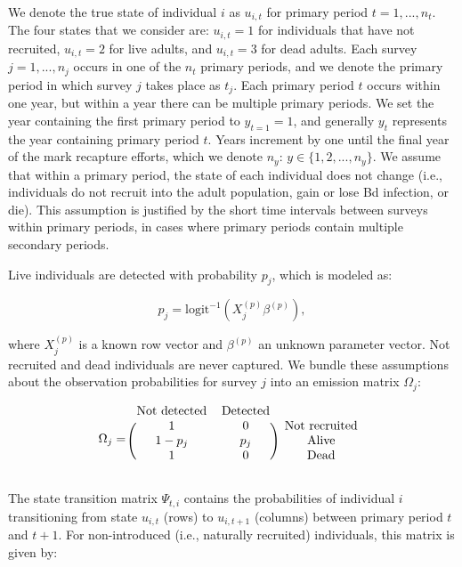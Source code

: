 \documentclass[
  letterpaper,
  DIV=11,
  numbers=noendperiod]{scrartcl}
\begin{document}
We denote the true state of individual \(i\) as \(u_{i, t}\) for primary
period \(t = 1,..., n_t\). The four states that we consider are:
\(u_{i, t} = 1\) for individuals that have not recruited,
\(u_{i, t} =2\) for live adults, and \(u_{i, t} = 3\) for dead adults.
Each survey \(j=1, ..., n_j\) occurs in one of the \(n_t\) primary
periods, and we denote the primary period in which survey \(j\) takes
place as \(t_j\). Each primary period \(t\) occurs within one year, but
within a year there can be multiple primary periods. We set the year
containing the first primary period to \(y_{t = 1} = 1\), and generally
\(y_t\) represents the year containing primary period \(t\). Years
increment by one until the final year of the mark recapture efforts,
which we denote \(n_y\): \(y \in \{1, 2, ..., n_y\}\). We assume that
within a primary period, the state of each individual does not change
(i.e., individuals do not recruit into the adult population, gain or
lose Bd infection, or die). This assumption is justified by the short
time intervals between surveys within primary periods, in cases where
primary periods contain multiple secondary periods.

Live individuals are detected with probability \(p_j\), which is modeled
as:

\[p_j = \text{logit}^{-1}(X_j^{(p)} \beta^{(p)}),\]

where \(X_j^{(p)}\) is a known row vector and \(\beta^{(p)}\) an unknown
parameter vector. Not recruited and dead individuals are never captured.
We bundle these assumptions about the observation probabilities for
survey \(j\) into an emission matrix \(\Omega_j\):

\[
\Omega_j =
\begin{blockarray}{ccc}
  \text{Not detected} & \text{Detected} \\
\begin{block}{(cc)c}
  1 & 0 & \text{Not recruited} \\
  1 - p_j & p_j & \text{Alive} \\
  1 & 0 & \text{Dead} \\
\end{block}
\end{blockarray}
\]

The state transition matrix \(\Psi_{t, i}\) contains the probabilities
of individual \(i\) transitioning from state \(u_{i, t}\) (rows) to
\(u_{i, t+1}\) (columns) between primary period \(t\) and \(t+1\). For
non-introduced (i.e., naturally recruited) individuals, this matrix is
given by:
\end{document}
